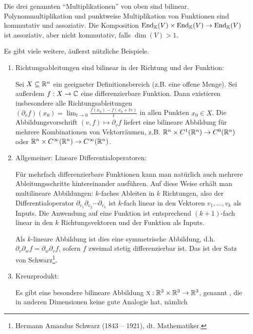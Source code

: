 \begin{example}
	Die drei genannten \enquote{Multiplikationen} von oben sind bilinear. Polynommultiplikation und punktweise Multiplikation von Funktionen sind kommutativ und assoziativ. Die Komposition $\operatorname{End}_{\mathbb{K}}(V)\times\operatorname{End}_{\mathbb{K}}(V)\to\operatorname{End}_{\mathbb{K}}(V)$ ist assoziativ, aber nicht kommutativ, falls $\dim(V) > 1$.
	
	Es gibt viele weitere, äußerst nützliche Beispiele.
	\begin{enumerate}[start=4]
		\item Richtungsableitungen sind bilinear in der Richtung und der Funktion:
		
		Sei $X\subseteq\mathbb{R}^n$ ein geeigneter Definitionsbereich (z.B. eine offene Menge). Sei außerdem $f:X \to\mathbb{C}$ eine differenzierbare Funktion. Dann existieren insbesondere alle Richtungsableitungen $(\partial_vf)(x_0) = \lim_{t\to 0} \frac{f(x_0)-f(x_0+tv)}{t}$ in allen Punkten $x_0\in X$. Die Abbildungsvorschrift $(v,f) \mapsto \partial_v f$ liefert eine bilineare Abbildung für mehrere Kombinationen von Vektorräumen, z.B. $\mathbb{R}^n \times C^1(\mathbb{R}^n) \to C^0(\mathbb{R}^n)$ oder $\mathbb{R}^n \times C^\infty(\mathbb{R}^n) \to C^\infty(\mathbb{R}^n)$.
		
		\item Allgemeiner: Lineare Differentialoperatoren:
		
		Für mehrfach differenzierbare Funktionen kann man natürlich auch mehrere Ableitungsschritte hintereinander ausführen. Auf diese Weise erhält man multilineare Abbildungen: $k$-faches Ableiten in $k$ Richtungen, also der Differentialoperator $\partial_{v_1} \partial_{v_2} \cdots \partial_{v_k}$ ist $k$-fach linear in den Vektoren $v_1, ..., v_k$ als Inputs. Die Anwendung auf eine Funktion ist entsprechend $(k+1)$-fach linear in den $k$ Richtungsvektoren und der Funktion als Inputs.
		
		Als $k$-lineare Abbildung ist dies eine symmetrische Abbildung, d.h. $\partial_v \partial_w f = \partial_w\partial_v f$, sofern $f$ zweimal stetig differenzierbar ist. Das ist der Satz von Schwarz\footnote{Hermann Amandus Schwarz (1843 -- 1921), dt. Mathematiker.}.
		
		\item Kreuzprodukt:
		
		Es gibt eine besondere bilineare Abbildung $\textsc{x} : \mathbb{R}^3 \times \mathbb{R}^3 \to \mathbb{R}^3$, genannt , die in anderen Dimensionen keine gute Analogie hat, nämlich
		

\end{enumerate}
\end{example}
